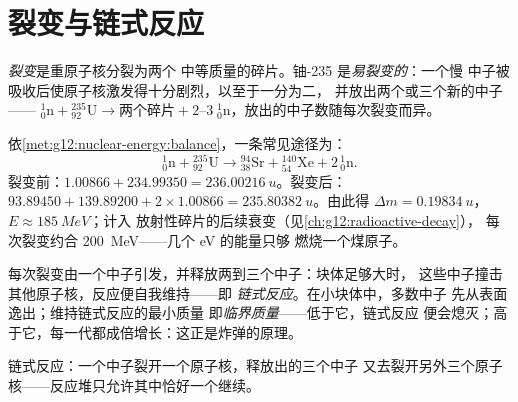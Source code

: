 \section{裂变与链式反应}

\begin{definition}[裂变]\label{def:g12:nuclear-energy:fission}
\emph{裂变}是重原子核分裂为两个
中等质量的碎片。铀-235 是\emph{易裂变的}：一个慢
中子被吸收后使原子核激发得十分剧烈，以至于一分为二，
并放出两个或三个新的中子——
${}^{1}_{0}\mathrm{n} + {}^{235}_{92}\mathrm{U} \to \text{两个碎片} +
2\text{--}3\;{}^{1}_{0}\mathrm{n}$，放出的中子数随每次裂变而异。
\end{definition}

\begin{example}[称量一次裂变]\label{ex:g12:nuclear-energy:fissionbalance}
依\cref{met:g12:nuclear-energy:balance}，一条常见途径为：
\[
{}^{1}_{0}\mathrm{n} + {}^{235}_{92}\mathrm{U} \longrightarrow
{}^{94}_{38}\mathrm{Sr} + {}^{140}_{54}\mathrm{Xe} + 2\,{}^{1}_{0}\mathrm{n}.
\]
裂变前：$1.00866 + 234.99350 = \qty{236.00216}{u}$。裂变后：
$93.89450 + 139.89200 + 2 \times 1.00866 = \qty{235.80382}{u}$。由此得
$\Delta m = \qty{0.19834}{u}$，$E \approx \qty{185}{MeV}$；计入
放射性碎片的后续衰变（见\cref{ch:g12:radioactive-decay}），
每次裂变约合 \qty{200}{MeV}——几个 \unit{eV} 的能量只够
燃烧一个煤原子。
\end{example}

\begin{definition}[链式反应与临界质量]\label{def:g12:nuclear-energy:chain}
每次裂变由一个中子引发，并释放两到三个中子：块体足够大时，
这些中子撞击其他原子核，反应便自我维持——即
\emph{链式反应}。在小块体中，多数中子
先从表面逸出；维持链式反应的最小质量
即\emph{临界质量}——低于它，链式反应
便会熄灭；高于它，每一代都成倍增长：这正是炸弹的原理。
\end{definition}

\begin{omfigure}

{\small 链式反应：一个中子裂开一个原子核，释放出的三个中子
又去裂开另外三个原子核——反应堆只允许其中恰好一个继续。}
\end{omfigure}

